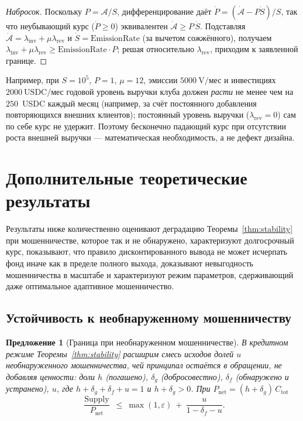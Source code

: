 \documentclass[11pt]{article}
\theoremstyle{plain}
\newtheorem{proposition}{Предложение}
\theoremstyle{definition}
\theoremstyle{remark}
\newcommand{\V}{\mathrm{V}}
\newcommand{\Supply}{\operatorname{Supply}}
\begin{document}
\begin{proof}[Набросок]
Поскольку $P = \mathcal{A}/S$, дифференцирование даёт $\dot P = (\dot{\mathcal{A}} - P\dot S)/S$, так что неубывающий курс ($\dot P \ge 0$) эквивалентен $\dot{\mathcal{A}} \ge P\,\dot S$. Подставляя $\dot{\mathcal{A}} = \lambda_{\mathrm{inv}} + \mu\lambda_{\mathrm{rev}}$ и $\dot S = \mathrm{EmissionRate}$ (за вычетом сожжённого), получаем $\lambda_{\mathrm{inv}} + \mu\lambda_{\mathrm{rev}} \ge \mathrm{EmissionRate}\cdot P$; решая относительно $\lambda_{\mathrm{rev}}$, приходим к заявленной границе.
\end{proof}

Например, при $S = 10^5$, $P = 1$, $\mu = 12$, эмиссии $5000~\V/\text{мес}$ и инвестициях $2000~\text{USDC}/\text{мес}$ годовой уровень выручки клуба должен \emph{расти} не менее чем на $250$~USDC каждый месяц (например, за счёт постоянного добавления повторяющихся внешних клиентов); постоянный уровень выручки ($\lambda_{\mathrm{rev}}=0$) сам по себе курс не удержит. Поэтому бесконечно падающий курс при отсутствии роста внешней выручки --- математическая необходимость, а не дефект дизайна.

\section{Дополнительные теоретические результаты}\label{sec:further}

Результаты ниже количественно оценивают деградацию Теоремы~\ref{thm:stability} при мошенничестве, которое так и не обнаружено, характеризуют долгосрочный курс, показывают, что правило дисконтированного вывода не может исчерпать фонд иначе как в пределе полного выхода, доказывают невыгодность мошенничества в масштабе и характеризуют режим параметров, сдерживающий даже оптимальное адаптивное мошенничество.

\subsection{Устойчивость к необнаруженному мошенничеству}

\begin{proposition}[Граница при необнаруженном мошенничестве]\label{prop:genstab}
В кредитном режиме Теоремы~\ref{thm:stability} расширим смесь исходов долей $u$ \emph{необнаруженного} мошенничества, чей принципал остаётся в обращении, не добавляя ценности: доли $h$ (погашено), $\delta_g$ (добросовестно), $\delta_f$ (обнаружено и устранено), $u$, где $h+\delta_g+\delta_f+u=1$ и $h+\delta_g>0$. При $P_{\mathrm{net}}=(h+\delta_g)\,C_{\mathrm{tot}}$
\[
\frac{\Supply}{P_{\mathrm{net}}}\ \le\ \max(1,\varepsilon)\ +\ \frac{u}{1-\delta_f-u}.
\]
\end{proposition}
\end{document}
